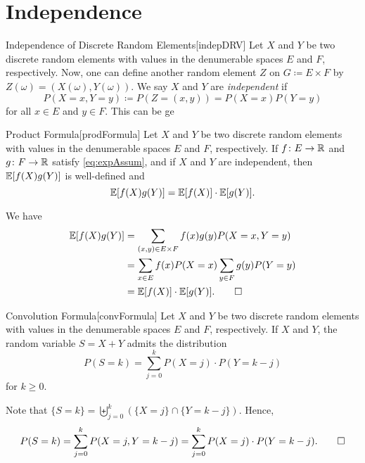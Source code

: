 \documentclass[../probability.tex]{subfiles}
\begin{document}
\section{Independence}

\begin{Definition}{Independence of Discrete Random Elements}[indepDRV]
    Let \(X\) and \(Y\) be two discrete random elements
    with values in the denumerable spaces \(E\) and \(F\), respectively.
    Now, one can define another random element \(Z\) on \(G \coloneqq E \times F\)
    by \(Z(\omega) = (X(\omega), Y(\omega))\).
    We say \(X\) and \(Y\) are \emph{independent} if
    \[
        P(X = x, Y = y) \coloneqq P(Z = (x, y)) = P(X = x) P(Y = y)
    \]
    for all \(x \in E\) and \(y \in F\).
    This can be ge
\end{Definition}

\begin{Lemma}{Product Formula}[prodFormula]
    Let \(X\) and \(Y\) be two discrete random elements
    with values in the denumerable spaces \(E\) and \(F\), respectively.
    If \(f \colon E \to \RR\) and \(g \colon F \to \RR\)
    satisfy \eqref{eq:expAssum}, and if \(X\) and \(Y\)
    are independent, then \(\mathbb{E}[f(X)g(Y)]\) is well-defined and
    \[
        \mathbb{E}[f(X)g(Y)] = \mathbb{E}[f(X)]\cdot \mathbb{E}[g(Y)]\text.
    \]
\end{Lemma}
\begin{myproof}[Proof]
    We have
    \begin{align*}
        \mathbb{E}[f(X)g(Y)]
        &= \sum_{(x, y)\in E \times F} f(x) g(y) P(X = x, Y = y) \\
        &= \sum_{x \in E} f(x) P(X = x) \sum_{y \in F} g(y) P(Y = y) \\
        &= \mathbb{E}[f(X)] \cdot \mathbb{E}[g(Y)]\text.\qedhere
    \end{align*}
\end{myproof}

\begin{Lemma}{Convolution Formula}[convFormula]
    Let \(X\) and \(Y\) be two discrete random elements
    with values in the denumerable spaces \(E\) and \(F\), respectively.
    If \(X\) and \(Y\),
    the random variable \(S = X + Y\) admits the distribution
    \[
        P(S = k) = \sum_{j=0}^k P(X=j) \cdot P(Y=k-j)
    \]
    for \(k \ge 0\).
\end{Lemma}
\begin{myproof}[Proof]
    Note that \(\{S=k\} = \biguplus_{j=0}^k (\{X=j\} \cap \{Y=k-j\})\).
    Hence,
    \[
        P(S = k) = \sum_{j=0}^k P(X=j, Y=k-j)
        = \sum_{j=0}^k P(X=j) \cdot P(Y=k-j)\text.\qedhere
    \]
\end{myproof}
\end{document}
